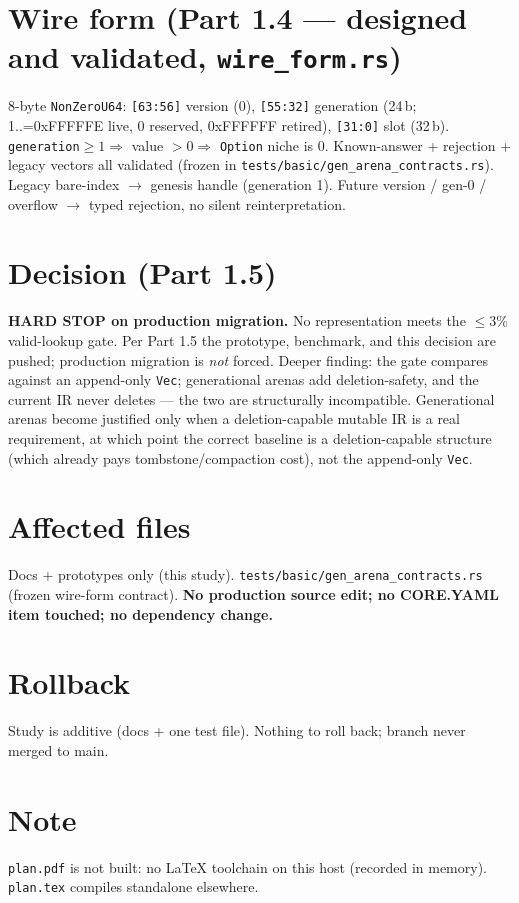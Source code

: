 \documentclass[11pt]{article}
\begin{document}
\section*{Wire form (Part 1.4 --- designed and validated, \texttt{wire\_form.rs})}
8-byte \texttt{NonZeroU64}: \texttt{[63:56]} version (0), \texttt{[55:32]}
generation (24\,b; 1..=0xFFFFFE live, 0 reserved, 0xFFFFFF retired),
\texttt{[31:0]} slot (32\,b). \texttt{generation}$\geq 1 \Rightarrow$ value
$>0 \Rightarrow$ \texttt{Option} niche is 0. Known-answer + rejection + legacy
vectors all validated (frozen in \texttt{tests/basic/gen\_arena\_contracts.rs}).
Legacy bare-index $\to$ genesis handle (generation 1). Future version / gen-0 /
overflow $\to$ typed rejection, no silent reinterpretation.

\section*{Decision (Part 1.5)}
\textbf{HARD STOP on production migration.} No representation meets the
$\leq 3\%$ valid-lookup gate. Per Part 1.5 the prototype, benchmark, and this
decision are pushed; production migration is \emph{not} forced. Deeper finding:
the gate compares against an append-only \texttt{Vec}; generational arenas add
deletion-safety, and the current IR never deletes --- the two are structurally
incompatible. Generational arenas become justified only when a deletion-capable
mutable IR is a real requirement, at which point the correct baseline is a
deletion-capable structure (which already pays tombstone/compaction cost), not
the append-only \texttt{Vec}.

\section*{Affected files}
Docs + prototypes only (this study). \texttt{tests/basic/gen\_arena\_contracts.rs}
(frozen wire-form contract). \textbf{No production source edit; no CORE.YAML item
touched; no dependency change.}

\section*{Rollback}
Study is additive (docs + one test file). Nothing to roll back; branch never
merged to main.

\section*{Note}
\texttt{plan.pdf} is not built: no LaTeX toolchain on this host (recorded in
memory). \texttt{plan.tex} compiles standalone elsewhere.
\end{document}
